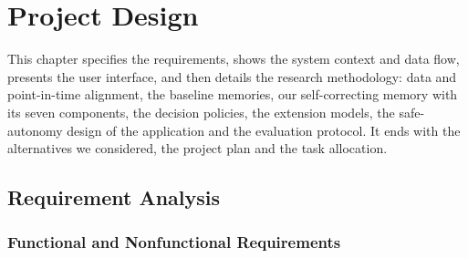 \chapter{Project Design}
\label{ch:design}

This chapter specifies the requirements, shows the system context and data flow, presents the user interface, and then details the research methodology: data and point-in-time alignment, the baseline memories, our self-correcting memory with its seven components, the decision policies, the extension models, the safe-autonomy design of the application and the evaluation protocol. It ends with the alternatives we considered, the project plan and the task allocation.

\section{Requirement Analysis}
\subsection{Functional and Nonfunctional Requirements}
